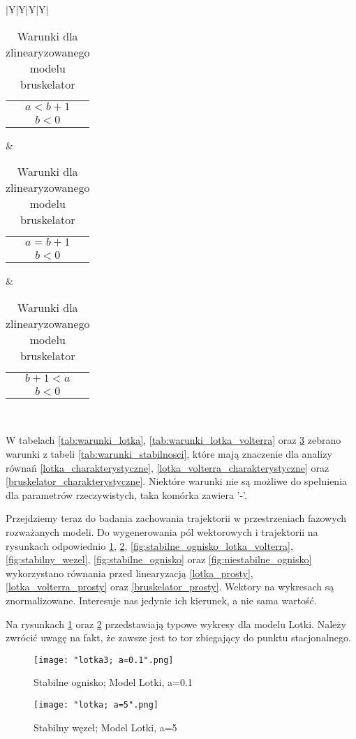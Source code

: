 \documentclass[10pt, a4paper, twoside, onecolumn]{article}
\numberwithin{equation}{section}
\begin{document}
\begin{table}[H]
\begin{tabularx}{\textwidth}{|Y|Y|Y|Y|}
{\begin{tabularx}{\columnwidth}{c}
				\(a<b+1\) \\
				\(b<0\)
			\end{tabularx}}
			& 
			{\begin{tabularx}{\columnwidth}{c} %
				\(a=b+1\) \\
				\(b<0\)
			\end{tabularx}}
			&
			{\begin{tabularx}{\columnwidth}{c} %
				\(b+1<a\) \\
				\(b<0\)
			\end{tabularx}}
			\\ 
		\end{tabularx}
		\caption{Warunki dla zlinearyzowanego modelu bruskelator}
		\label{tab:warunki_bruskelator}
	\end{table}
	W tabelach \ref{tab:warunki_lotka}, \ref{tab:warunki_lotka_volterra} oraz \ref{tab:warunki_bruskelator} zebrano warunki z tabeli \ref{tab:warunki_stabilnosci}, które mają znaczenie dla analizy równań \eqref{lotka_charakterystyczne}, \eqref{lotka_volterra_charakterystyczne} oraz \eqref{bruskelator_charakterystyczne}. Niektóre warunki nie są możliwe do spełnienia dla parametrów rzeczywistych, taka komórka zawiera '-'. \par
	Przejdziemy teraz do badania zachowania trajektorii w przestrzeniach fazowych rozważanych modeli. Do wygenerowania pól wektorowych i trajektorii na rysunkach odpowiednio \ref{fig:stabilne_ognisko_lotka}, \ref{fig:stabilny_wezel_lotka}, \ref{fig:stabilne_ognisko_lotka_volterra}, \ref{fig:stabilny_wezel}, \ref{fig:stabilne_ognisko} oraz \ref{fig:niestabilne_ognisko} wykorzystano równania przed linearyzacją \eqref{lotka_prosty}, \eqref{lotka_volterra_prosty} oraz \eqref{bruskelator_prosty}. Wektory na wykresach są znormalizowane. Interesuje nas jedynie ich kierunek, a nie sama wartość. \par
	Na rysunkach \ref{fig:stabilne_ognisko_lotka} oraz \ref{fig:stabilny_wezel_lotka} przedstawiają typowe wykresy dla modelu Lotki. Należy zwrócić uwagę na fakt, że zawsze jest to tor zbiegający do punktu stacjonalnego. 
	\begin{figure}[H]
		\centering
		\texttt{[image: "lotka3; a=0.1".png]}
		\caption{Stabilne ognisko; Model Lotki, a=0.1}
		\label{fig:stabilne_ognisko_lotka}
	\end{figure}
	\begin{figure}[H]
		\centering
		\texttt{[image: "lotka; a=5".png]}
		\caption{Stabilny węzeł; Model Lotki, a=5}
		\label{fig:stabilny_wezel_lotka}
	\end{figure}\newpage
\end{document}
